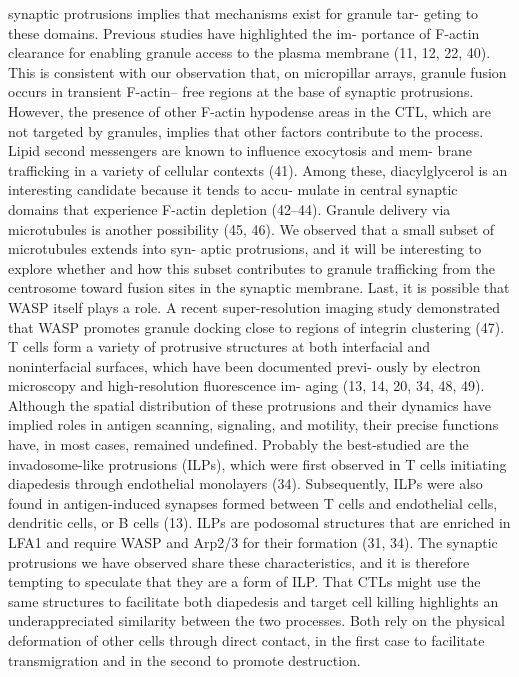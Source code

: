 synaptic protrusions implies that mechanisms exist for granule tar- geting to these domains. Previous studies have highlighted the im- portance of F-actin clearance for enabling granule access to the plasma membrane (11, 12, 22, 40). This is consistent with our observation that, on micropillar arrays, granule fusion occurs in transient F-actin– free regions at the base of synaptic protrusions. However, the presence of other F-actin hypodense areas in the CTL, which are not targeted by granules, implies that other factors contribute to the process. Lipid second messengers are known to influence exocytosis and mem- brane trafficking in a variety of cellular contexts (41). Among these, diacylglycerol is an interesting candidate because it tends to accu- mulate in central synaptic domains that experience F-actin depletion (42–44). Granule delivery via microtubules is another possibility (45, 46). We observed that a small subset of microtubules extends into syn- aptic protrusions, and it will be interesting to explore whether and how this subset contributes to granule trafficking from the centrosome toward fusion sites in the synaptic membrane. Last, it is possible that WASP itself plays a role. A recent super-resolution imaging study demonstrated that WASP promotes granule docking close to regions of integrin clustering (47). T cells form a variety of protrusive structures at both interfacial and noninterfacial surfaces, which have been documented previ- ously by electron microscopy and high-resolution fluorescence im- aging (13, 14, 20, 34, 48, 49). Although the spatial distribution of these protrusions and their dynamics have implied roles in antigen scanning, signaling, and motility, their precise functions have, in most cases, remained undefined. Probably the best-studied are the invadosome-like protrusions (ILPs), which were first observed in T cells initiating diapedesis through endothelial monolayers (34). Subsequently, ILPs were also found in antigen-induced synapses formed between T cells and endothelial cells, dendritic cells, or B cells (13). ILPs are podosomal structures that are enriched in LFA1 and require WASP and Arp2/3 for their formation (31, 34). The synaptic protrusions we have observed share these characteristics, and it is therefore tempting to speculate that they are a form of ILP. That CTLs might use the same structures to facilitate both diapedesis and target cell killing highlights an underappreciated similarity between the two processes. Both rely on the physical deformation of other cells through direct contact, in the first case to facilitate transmigration and in the second to promote destruction. 

